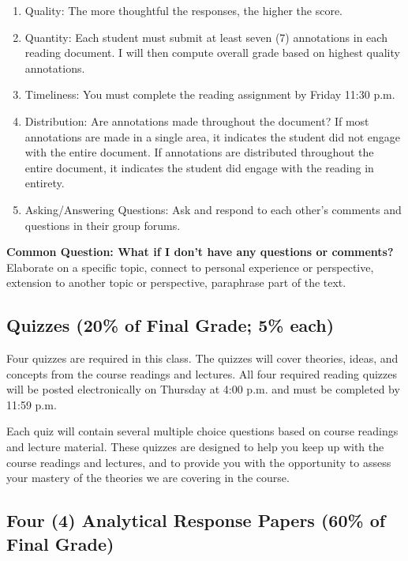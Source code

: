 \documentclass[11pt,]{article}
\providecommand{\tightlist}{%
  \setlength{\itemsep}{0pt}\setlength{\parskip}{0pt}}
\begin{document}
\begin{enumerate}
\def\labelenumi{\arabic{enumi}.}
\tightlist
\item
  Quality: The more thoughtful the responses, the higher the score.
\item
  Quantity: Each student must submit at least seven (7) annotations in
  each reading document. I will then compute overall grade based on
  highest quality annotations.
\item
  Timeliness: You must complete the reading assignment by Friday 11:30
  p.m.
\item
  Distribution: Are annotations made throughout the document? If most
  annotations are made in a single area, it indicates the student did
  not engage with the entire document. If annotations are distributed
  throughout the entire document, it indicates the student did engage
  with the reading in entirety.
\item
  Asking/Answering Questions: Ask and respond to each other's comments
  and questions in their group forums.
\end{enumerate}

\textbf{Common Question: What if I don't have any questions or
comments?} Elaborate on a specific topic, connect to personal experience
or perspective, extension to another topic or perspective, paraphrase
part of the text.

\hypertarget{quizzes}{%
\subsection{Quizzes (20\% of Final Grade; 5\% each)}\label{quizzes}}

Four quizzes are required in this class. The quizzes will cover
theories, ideas, and concepts from the course readings and lectures. All
four required reading quizzes will be posted electronically on Thursday
at 4:00 p.m. and must be completed by 11:59 p.m.

Each quiz will contain several multiple choice questions based on course
readings and lecture material. These quizzes are designed to help you
keep up with the course readings and lectures, and to provide you with
the opportunity to assess your mastery of the theories we are covering
in the course.

\hypertarget{writing_assignments}{%
\subsection{Four (4) Analytical Response Papers (60\% of Final
Grade)}\label{writing_assignments}}
\end{document}
